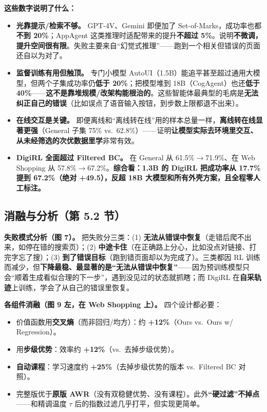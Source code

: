 \documentclass[11pt,UTF8,fontset=fandol]{ctexart}
\begin{document}
\textbf{这些数字说明了什么：}
\begin{itemize}[leftmargin=1.4em]
\item \textbf{光靠提示/检索不够。} GPT-4V、Gemini 即便加了 Set-of-Marks，成功率也都\textbf{不到 20\%}；AppAgent 这类推理时适配带来的提升\textbf{不超过 5\%}。说明\textbf{不微调，提升空间很有限}。失败主要来自“幻觉式推理”——跑到一个相关但错误的页面还自以为对了。
\item \textbf{监督训练有用但触顶。} 专门小模型 AutoUI（1.5B）能追平甚至超过通用大模型，但两个子集成功率仍\textbf{低于 20\%}；把模型堆到 18B（CogAgent）也还\textbf{低于 40\%}——\textbf{这不是靠堆规模/改架构能根治的}。这些智能体最典型的毛病是\textbf{无法纠正自己的错误}（比如误点了语音输入按钮，到步数上限都退不出来）。
\item \textbf{在线交互是关键。} 即便离线和“离线转在线”用的样本总量一样，\textbf{离线转在线显著更强}（General 子集 75\% vs.\ 62.8\%）——证明\textbf{让模型实际去环境里交互、从未经筛选的次优数据里学}非常有效。
\item \textbf{DigiRL 全面超过 Filtered BC。} 在 General 从 61.5\%$\to$71.9\%、在 Web Shopping 从 57.8\%$\to$67.2\%。\textbf{综合看：1.3B 的 DigiRL 把成功率从 17.7\% 提到 67.2\%（绝对 +49.5），反超 18B 大模型和所有外壳方案，且全程零人工标注。}
\end{itemize}

\subsection*{消融与分析（第 5.2 节）}

\textbf{失败模式分析（图 7）。} 把失败分三类：(1) \textbf{无法从错误中恢复}（走错后爬不出来，如停在错的搜索页）；(2) \textbf{中途卡住}（在正确路上分心，比如没点对链接、打完字忘了搜）；(3) \textbf{到了错误目标}（跑到错页面却以为完成了）。三类都因 RL 训练而减少，但\textbf{下降最稳、最显著的是“无法从错误中恢复”}——因为预训练模型只会“顺着生成看似合理的下一步”，遇到没见过的状态就抓瞎；而 DigiRL 在\textbf{自采轨迹}上训练，学会了从自己的错误里恢复。

\textbf{各组件消融（图 9 左，在 Web Shopping 上）。} 四个设计都必要：
\begin{itemize}[leftmargin=1.4em]
\item 价值函数用\textbf{交叉熵}（而非回归/均方）：约 \textbf{+12\%}（Ours vs.\ Ours w/ Regression）。
\item 用\textbf{步级优势}：效率约 \textbf{+12\%}（vs.\ 去掉步级优势）。
\item \textbf{自动课程}：学习速度约 \textbf{+25\%}（去掉步级优势的版本 vs.\ Filtered BC 对照）。
\item 完整版优于\textbf{原版 AWR}（没有双稳健优势、没有课程）。此外\textbf{“硬过滤”不掉点}——和精调温度 $\tau$ 后的指数过滤几乎打平，但实现更简单。
\end{itemize}
\end{document}
